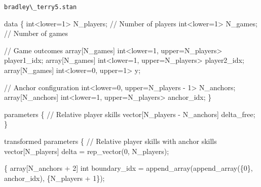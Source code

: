 \documentclass[
  letterpaper,
  DIV=11,
  numbers=noendperiod]{scrartcl}
\newenvironment{Shaded}{\begin{snugshade}}{\end{snugshade}}
\newcommand{\CommentTok}[1]{\textcolor[rgb]{0.37,0.37,0.37}{#1}}
\newcommand{\DataTypeTok}[1]{\textcolor[rgb]{0.68,0.00,0.00}{#1}}
\newcommand{\DecValTok}[1]{\textcolor[rgb]{0.68,0.00,0.00}{#1}}
\newcommand{\KeywordTok}[1]{\textcolor[rgb]{0.00,0.23,0.31}{#1}}
\newcommand{\NormalTok}[1]{\textcolor[rgb]{0.00,0.23,0.31}{#1}}
\begin{document}
\begin{codelisting}

\caption{\texttt{bradley\textbackslash\_terry5.stan}}

\begin{Shaded}
\begin{Highlighting}[]
\KeywordTok{data}\NormalTok{ \{}
  \DataTypeTok{int}\NormalTok{\textless{}}\KeywordTok{lower}\NormalTok{=}\DecValTok{1}\NormalTok{\textgreater{} N\_players; }\CommentTok{// Number of players}
  \DataTypeTok{int}\NormalTok{\textless{}}\KeywordTok{lower}\NormalTok{=}\DecValTok{1}\NormalTok{\textgreater{} N\_games;   }\CommentTok{// Number of games}

  \CommentTok{// Game outcomes}
  \DataTypeTok{array}\NormalTok{[N\_games] }\DataTypeTok{int}\NormalTok{\textless{}}\KeywordTok{lower}\NormalTok{=}\DecValTok{1}\NormalTok{, }\KeywordTok{upper}\NormalTok{=N\_players\textgreater{} player1\_idx;}
  \DataTypeTok{array}\NormalTok{[N\_games] }\DataTypeTok{int}\NormalTok{\textless{}}\KeywordTok{lower}\NormalTok{=}\DecValTok{1}\NormalTok{, }\KeywordTok{upper}\NormalTok{=N\_players\textgreater{} player2\_idx;}
  \DataTypeTok{array}\NormalTok{[N\_games] }\DataTypeTok{int}\NormalTok{\textless{}}\KeywordTok{lower}\NormalTok{=}\DecValTok{0}\NormalTok{, }\KeywordTok{upper}\NormalTok{=}\DecValTok{1}\NormalTok{\textgreater{} y;}

  \CommentTok{// Anchor configuration}
  \DataTypeTok{int}\NormalTok{\textless{}}\KeywordTok{lower}\NormalTok{=}\DecValTok{0}\NormalTok{, }\KeywordTok{upper}\NormalTok{=N\_players {-} }\DecValTok{1}\NormalTok{\textgreater{} N\_anchors;}
  \DataTypeTok{array}\NormalTok{[N\_anchors] }\DataTypeTok{int}\NormalTok{\textless{}}\KeywordTok{lower}\NormalTok{=}\DecValTok{1}\NormalTok{, }\KeywordTok{upper}\NormalTok{=N\_players\textgreater{} anchor\_idx;}
\NormalTok{\}}

\KeywordTok{parameters}\NormalTok{ \{}
  \CommentTok{// Relative player skills}
  \DataTypeTok{vector}\NormalTok{[N\_players {-} N\_anchors] delta\_free;}
\NormalTok{\}}

\KeywordTok{transformed parameters}\NormalTok{ \{}
  \CommentTok{// Relative player skills with anchor skills}
  \DataTypeTok{vector}\NormalTok{[N\_players] delta = rep\_vector(}\DecValTok{0}\NormalTok{, N\_players);}

\NormalTok{  \{}
    \DataTypeTok{array}\NormalTok{[N\_anchors + }\DecValTok{2}\NormalTok{] }\DataTypeTok{int}\NormalTok{ boundary\_idx}
\NormalTok{      = append\_array(append\_array(\{}\DecValTok{0}\NormalTok{\}, anchor\_idx), \{N\_players + }\DecValTok{1}\NormalTok{\});}


\end{Highlighting}
\end{Shaded}
\end{codelisting}
\end{document}
